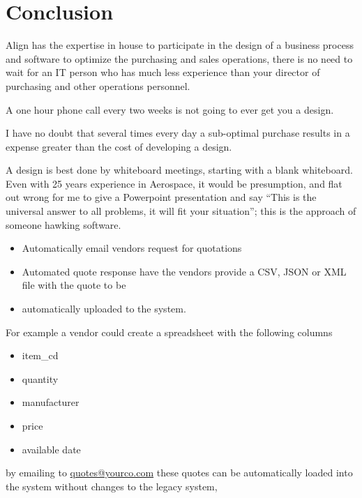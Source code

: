 \documentclass[letterpaper,10pt,english]{sphinxmanual}
\begin{document}
\chapter{Conclusion}
\label{FutureState:conclusion}
Align has the expertise in house to participate in the design of a
business process and software to optimize the purchasing and sales
operations, there is no need to wait for an IT person who has much less
experience than your director of purchasing and other operations
personnel.

A one hour phone call every two weeks is not going to ever get you a
design.

I have no doubt that several times every day a sub-optimal purchase
results in a expense greater than the cost of developing a design.

A design is best done by whiteboard meetings, starting with a blank
whiteboard. Even with 25 years experience in Aerospace, it would be
presumption, and flat out wrong for me to give a Powerpoint
presentation and say ``This is the universal answer to all problems, it
will fit your situation''; this is the approach of someone hawking
software.
\begin{itemize}
\item {} 
Automatically email vendors request for quotations

\item {} 
Automated quote response have the vendors provide a CSV, JSON or XML
file with the quote to be

\item {} 
automatically uploaded to the system.

\end{itemize}

For example a vendor could create a spreadsheet with the following
columns
\begin{itemize}
\item {} 
item\_cd

\item {} 
quantity

\item {} 
manufacturer

\item {} 
price

\item {} 
available date

\end{itemize}

by emailing to \href{mailto:quotes@yourco.com}{quotes@yourco.com} these quotes can be automatically
loaded into the system without changes to the legacy system,
\end{document}
